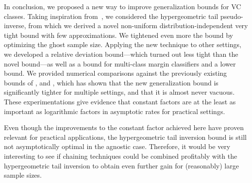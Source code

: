 \documentclass[twoside,11pt]{article}
\begin{document}
In conclusion, we proposed a new way to improve generalization bounds for VC classes.
Taking inspiration from~\citet{langford05}, we considered the hypergeometric tail pseudo-inverse, from which we derived a novel non-uniform distribution-independent very tight bound with few approximations.
We tightened even more the bound by optimizing the ghost sample size.
Applying the new technique to other settings, we developed a relative deviation bound---which turned out less tight than the novel bound---as well as a bound for multi-class margin classifiers and a lower bound.
We provided numerical comparisons against the previously existing bounds of \citet{vapnik98}, \citet{catoni2004improved} and \citet{lugosi2002pattern}, which has shown that the new generalization bound is significantly tighter for multiple settings, and that it is almost never vacuous.
These experimentations give evidence that constant factors are at the least as important as logarithmic factors in asymptotic rates for practical settings.

Even though the improvements to the constant factor achieved here have proven relevant for practical applications, the hypergeometric tail inversion bound is still not asymptotically optimal in the agnostic case.
Therefore, it would be very interesting to see if chaining techniques could be combined profitably with the hypergeometric tail inversion to obtain even further gain for (reasonably) large sample sizes.

\end{document}
